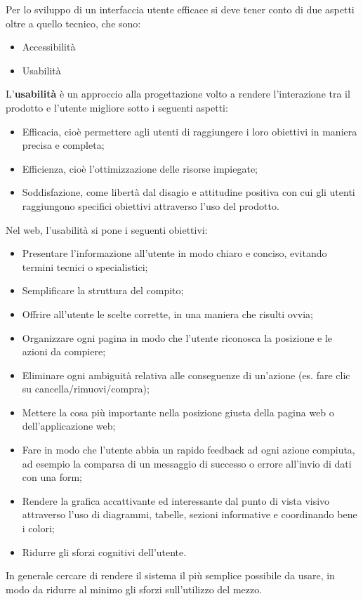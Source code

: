 Per lo sviluppo di un interfaccia utente efficace si deve tener conto di due aspetti oltre a quello tecnico, che sono:
\begin{itemize}
\item Accessibilità
\item Usabilità
\end{itemize}

L'\textbf{usabilità} è un approccio alla progettazione volto a rendere l'interazione tra il prodotto e l'utente migliore sotto i seguenti aspetti:
\begin{itemize}
    \item Efficacia, cioè permettere agli utenti di raggiungere i loro obiettivi in maniera precisa e completa;
    \item Efficienza, cioè l'ottimizzazione delle risorse impiegate;
    \item Soddisfazione, come libertà dal disagio e attitudine positiva con cui gli utenti raggiungono specifici obiettivi attraverso l’uso del prodotto.
\end{itemize}
Nel web, l'usabilità si pone i seguenti obiettivi:
\begin{itemize}
    \item Presentare l'informazione all'utente in modo chiaro e conciso, evitando termini tecnici o specialistici;
    \item Semplificare la struttura del compito;
    \item Offrire all'utente le scelte corrette, in una maniera che risulti ovvia;
    \item Organizzare ogni pagina in modo che l'utente riconosca la posizione e le azioni da compiere;
    \item Eliminare ogni ambiguità relativa alle conseguenze di un'azione (es. fare clic su cancella/rimuovi/compra);
    \item Mettere la cosa più importante nella posizione giusta della pagina web o dell'applicazione web;
    \item Fare in modo che l'utente abbia un rapido feedback ad ogni azione compiuta, ad esempio la comparsa di un messaggio di successo o errore all'invio di dati con una form;
    \item Rendere la grafica accattivante ed interessante dal punto di vista visivo attraverso l'uso di diagrammi, tabelle, sezioni informative e coordinando bene i colori;
    \item Ridurre gli sforzi cognitivi dell'utente.
\end{itemize}
In generale cercare di rendere il sistema il più semplice possibile da usare, in modo da ridurre al minimo gli sforzi sull'utilizzo del mezzo.

